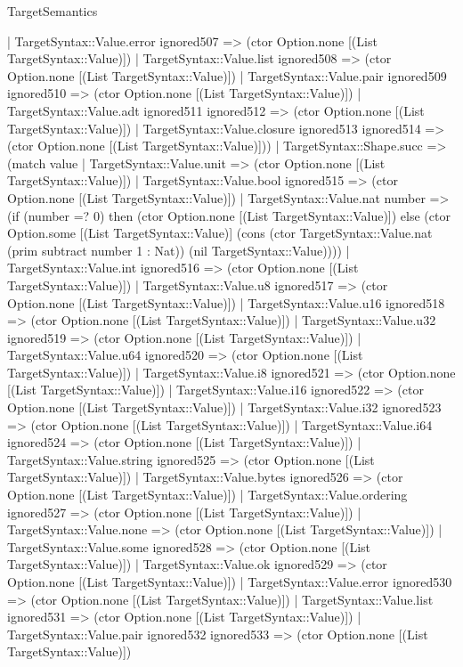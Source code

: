 \begin{lexlean}{TargetSemantics}
\begin{semanticmodule}
{      | TargetSyntax::Value.error ignored507 => (ctor Option.none [(List TargetSyntax::Value)])
      | TargetSyntax::Value.list ignored508 => (ctor Option.none [(List TargetSyntax::Value)])
      | TargetSyntax::Value.pair ignored509 ignored510 => (ctor Option.none [(List TargetSyntax::Value)])
      | TargetSyntax::Value.adt ignored511 ignored512 => (ctor Option.none [(List TargetSyntax::Value)])
      | TargetSyntax::Value.closure ignored513 ignored514 => (ctor Option.none [(List TargetSyntax::Value)]))
    | TargetSyntax::Shape.succ => (match value
      | TargetSyntax::Value.unit => (ctor Option.none [(List TargetSyntax::Value)])
      | TargetSyntax::Value.bool ignored515 => (ctor Option.none [(List TargetSyntax::Value)])
      | TargetSyntax::Value.nat number => (if (number =? 0) then (ctor Option.none [(List TargetSyntax::Value)]) else (ctor Option.some [(List TargetSyntax::Value)] (cons (ctor TargetSyntax::Value.nat (prim subtract number 1 : Nat)) (nil TargetSyntax::Value))))
      | TargetSyntax::Value.int ignored516 => (ctor Option.none [(List TargetSyntax::Value)])
      | TargetSyntax::Value.u8 ignored517 => (ctor Option.none [(List TargetSyntax::Value)])
      | TargetSyntax::Value.u16 ignored518 => (ctor Option.none [(List TargetSyntax::Value)])
      | TargetSyntax::Value.u32 ignored519 => (ctor Option.none [(List TargetSyntax::Value)])
      | TargetSyntax::Value.u64 ignored520 => (ctor Option.none [(List TargetSyntax::Value)])
      | TargetSyntax::Value.i8 ignored521 => (ctor Option.none [(List TargetSyntax::Value)])
      | TargetSyntax::Value.i16 ignored522 => (ctor Option.none [(List TargetSyntax::Value)])
      | TargetSyntax::Value.i32 ignored523 => (ctor Option.none [(List TargetSyntax::Value)])
      | TargetSyntax::Value.i64 ignored524 => (ctor Option.none [(List TargetSyntax::Value)])
      | TargetSyntax::Value.string ignored525 => (ctor Option.none [(List TargetSyntax::Value)])
      | TargetSyntax::Value.bytes ignored526 => (ctor Option.none [(List TargetSyntax::Value)])
      | TargetSyntax::Value.ordering ignored527 => (ctor Option.none [(List TargetSyntax::Value)])
      | TargetSyntax::Value.none => (ctor Option.none [(List TargetSyntax::Value)])
      | TargetSyntax::Value.some ignored528 => (ctor Option.none [(List TargetSyntax::Value)])
      | TargetSyntax::Value.ok ignored529 => (ctor Option.none [(List TargetSyntax::Value)])
      | TargetSyntax::Value.error ignored530 => (ctor Option.none [(List TargetSyntax::Value)])
      | TargetSyntax::Value.list ignored531 => (ctor Option.none [(List TargetSyntax::Value)])
      | TargetSyntax::Value.pair ignored532 ignored533 => (ctor Option.none [(List TargetSyntax::Value)])
}
\end{semanticmodule}
\end{lexlean}
